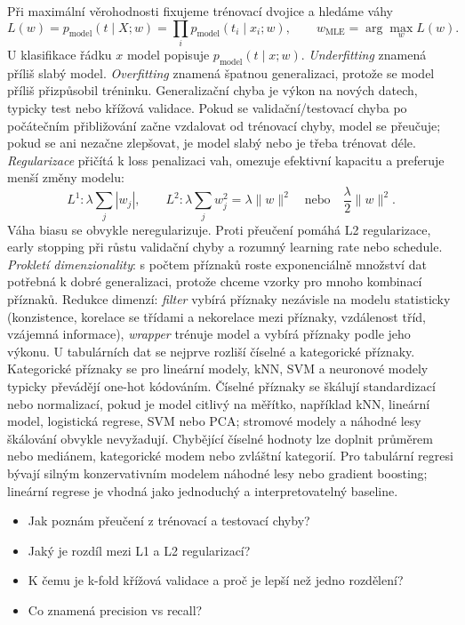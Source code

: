 \begin{odpoved}
Při maximální věrohodnosti fixujeme trénovací dvojice a hledáme váhy
\[
L(w)=p_{\mathrm{model}}(t\mid X;w)=\prod_i p_{\mathrm{model}}(t_i\mid x_i;w),\qquad
w_{\mathrm{MLE}}=\arg\max_w L(w).
\]
U klasifikace řádku $x$ model popisuje $p_{\mathrm{model}}(t\mid x;w)$.
\emph{Underfitting} znamená příliš slabý model. \emph{Overfitting} znamená špatnou generalizaci, protože se model příliš přizpůsobil tréninku. Generalizační chyba je výkon na nových datech, typicky test nebo křížová validace. Pokud se validační/testovací chyba po počátečním přibližování začne vzdalovat od trénovací chyby, model se přeučuje; pokud se ani nezačne zlepšovat, je model slabý nebo je třeba trénovat déle.
\emph{Regularizace} přičítá k loss penalizaci vah, omezuje efektivní kapacitu a preferuje menší změny modelu:
\[
L^1:\lambda\sum_j |w_j|,\qquad
L^2:\lambda\sum_jw_j^2=\lambda\|w\|^2
\quad\text{nebo}\quad \frac\lambda2\|w\|^2.
\]
Váha biasu se obvykle neregularizuje. Proti přeučení pomáhá L2 regularizace, early stopping při růstu validační chyby a rozumný learning rate nebo schedule.
\emph{Prokletí dimenzionality}: s počtem příznaků roste exponenciálně množství dat potřebná k dobré generalizaci, protože chceme vzorky pro mnoho kombinací příznaků. Redukce dimenzí: \emph{filter} vybírá příznaky nezávisle na modelu statisticky (konzistence, korelace se třídami a nekorelace mezi příznaky, vzdálenost tříd, vzájemná informace), \emph{wrapper} trénuje model a vybírá příznaky podle jeho výkonu.
U tabulárních dat se nejprve rozliší číselné a kategorické příznaky. Kategorické příznaky se pro lineární modely, kNN, SVM a neuronové modely typicky převádějí one-hot kódováním. Číselné příznaky se škálují standardizací nebo normalizací, pokud je model citlivý na měřítko, například kNN, lineární model, logistická regrese, SVM nebo PCA; stromové modely a náhodné lesy škálování obvykle nevyžadují. Chybějící číselné hodnoty lze doplnit průměrem nebo mediánem, kategorické modem nebo zvláštní kategorií. Pro tabulární regresi bývají silným konzervativním modelem náhodné lesy nebo gradient boosting; lineární regrese je vhodná jako jednoduchý a interpretovatelný baseline.
\end{odpoved}

\begin{recall}
\begin{itemize}[leftmargin=1.2em,itemsep=0pt,topsep=1pt]
  \item Jak poznám přeučení z trénovací a testovací chyby?
  \item Jaký je rozdíl mezi L1 a L2 regularizací?
  \item K čemu je k-fold křížová validace a proč je lepší než jedno rozdělení?
  \item Co znamená precision vs recall?
\end{itemize}
\end{recall}

